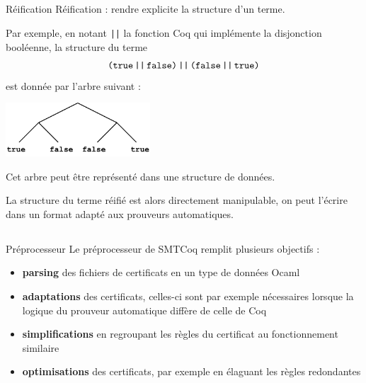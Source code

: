 \documentclass{beamer}
\begin{document}
\subsection{}
\begin{frame}{Réification}
    Réification : rendre explicite la structure d'un terme.
    
    \vspace{3mm}
    
    Par exemple, en notant \texttt{||} la fonction Coq qui implémente la disjonction booléenne, la structure du terme \[ \texttt{(true\,||\,false)\,||\,(false\,||\,true)}\]
    est donnée par l'arbre suivant :
    \begin{center}
    \includegraphics[height=2cm]{booltree.pdf}
    \end{center}
    Cet arbre peut être représenté dans une structure de données.
    
    \vspace{3mm}
    
    La structure du terme réifié est alors directement manipulable, on peut l'écrire dans un format adapté aux prouveurs automatiques.
\end{frame}

\subsection{}
\begin{frame}{Préprocesseur}
Le préprocesseur de SMTCoq remplit plusieurs objectifs :
\begin{itemize}
    \item \textbf{parsing} des fichiers de certificats en un type de données Ocaml
    \item \textbf{adaptations} des certificats, celles-ci sont par exemple nécessaires lorsque la logique du prouveur automatique diffère de celle de Coq
    \item \textbf{simplifications} en regroupant les règles du certificat au fonctionnement similaire
    \item \textbf{optimisations} des certificats, par exemple en élaguant les règles redondantes
\end{itemize}
\end{frame}
\end{document}
